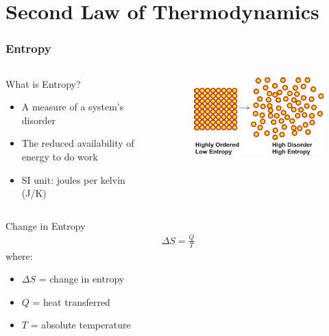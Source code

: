 \documentclass{beamer}
\begin{document}
\section{Second Law of Thermodynamics}

\begin{frame}
    \frametitle{Entropy}
    \begin{columns}
        \begin{block}{What is Entropy?}
            \begin{itemize}
                \item A measure of a system's disorder
                \item The reduced availability of energy to do work
                \item SI unit: joules per kelvin (J/K)
            \end{itemize}
        \end{block}
        
        \begin{center}
            \begin{figure}
                \centering
                \includegraphics[width=0.8\linewidth]{phys11-thermo-entropy-disorder.jpg}
            \end{figure}
        \end{center}
    \end{columns}
    
    \begin{exampleblock}{Change in Entropy}
        \begin{align*}
            \Delta S = \frac{Q}{T}
        \end{align*}
        where:
        \begin{itemize}
            \item $\Delta S$ = change in entropy
            \item $Q$ = heat transferred
            \item $T$ = absolute temperature
        \end{itemize}
    \end{exampleblock}
\end{frame}
\end{document}
